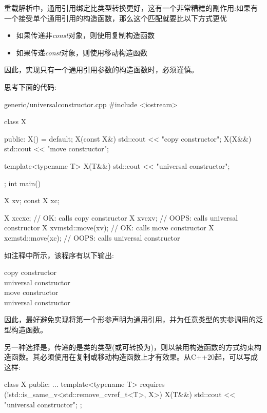 
重载解析中，通用引用绑定比类型转换更好，这有一个非常糟糕的副作用:如果有一个接受单个通用引用的构造函数，那么这个匹配就要比以下方式更优\par

\begin{itemize}
  \item 如果传递非\textit{const}对象，则使用复制构造函数
  \item 如果传递\textit{const}对象，则使用移动构造函数
\end{itemize}

因此，实现只有一个通用引用参数的构造函数时，必须谨慎。\par

思考下面的代码:\par

\begin{codeboxt}[cpp]{generic/universalconstructor.cpp}
#include <iostream>

class X {
public:
  X() = default;
  X(const X&) {
    std::cout << "copy constructor\n";
  }
  X(X&&) {
    std::cout << "move constructor\n";
  }

  template<typename T>
  X(T&&) {
    std::cout << "universal constructor\n";
  }
};
int main()
{
  X xv;
  const X xc;

  X xcc{xc}; // OK: calls copy constructor
  X xvc{xv}; // OOPS: calls universal constructor
  X xvm{std::move(xv)}; // OK: calls move constructor
  X xcm{std::move(xc)}; // OOPS: calls universal constructor
}
\end{codeboxt}

如注释中所示，该程序有以下输出:\par

\begin{myOutput}
copy constructor \\
universal constructor \\
move constructor \\
universal constructor
\end{myOutput}

因此，最好避免实现将第一个形参声明为通用引用，并为任意类型的实参调用的泛型构造函数。\par

另一种选择是，传递的是类的类型(或可转换为)，则以禁用构造函数的方式约束构造函数。其必须使用在复制或移动构造函数上才有效果。从C++20起，可以写成这样:\par

\begin{codebox}[cpp]
class X {
  public:
  ...
  template<typename T>
  requires (!std::is_same_v<std::remove_cvref_t<T>, X>)
  X(T&&) {
    std::cout << "universal constructor\n";
  }
};
\end{codebox}


